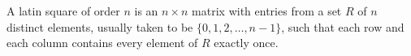 A latin square of order $n$ is an $n \times n$ matrix with entries from a set $R$ of $n$ distinct elements, usually taken to be $\{0, 1, 2, \dots, n-1\}$, such that each row and each column contains every element of $R$ exactly once.
